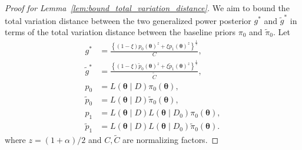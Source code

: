 \documentclass[12pt]{article}
\begin{document}
\begin{proof}[Proof for Lemma~\ref{lem:bound_total_variation_distance}]
    We aim to bound the total variation distance between the two generalized power posterior $g^*$ and $\tilde{g}^*$ in terms of the total variation distance between the baseline priors $\pi_0$ and $\tilde{\pi}_0$.
    Let 
    \begin{align*}
        g^* &= \frac{\left\{(1 - \xi)p_0(\bm{\theta})^z + \xi p_1(\bm{\theta})^z\right\}^{\frac{1}{z}}}{C}, \\
        \tilde{g}^* &= \frac{\left\{(1 - \xi)\tilde{p}_0(\bm{\theta})^z + \xi \tilde{p}_1(\bm{\theta})^z\right\}^{\frac{1}{z}}}{\tilde{C}}, \\
        p_0 &= L(\bm{\theta} \mid D) \pi_0(\bm{\theta}), \\
        \tilde{p}_0 &= L(\bm{\theta} \mid D) \tilde{\pi}_0(\bm{\theta}), \\
        p_1 &= L(\bm{\theta} \mid D) L(\bm{\theta} \mid D_0) \pi_0(\bm{\theta}), \\
        \tilde{p}_1 &= L(\bm{\theta} \mid D) L(\bm{\theta} \mid D_0) \tilde{\pi}_0(\bm{\theta}).
    \end{align*}
    where $z = (1 + \alpha) / 2$ and $C, \tilde{C}$ are normalizing factors.


\end{proof}
\end{document}
